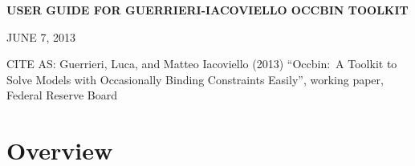 \documentclass[12pt]{article}
\begin{document}
\setcounter{secnumdepth}{-1}%

\renewcommand{\baselinestretch}{1.05}
\normalsize%

\begin{center}
\Large
\textbf{USER GUIDE FOR GUERRIERI-IACOVIELLO OCCBIN TOOLKIT}
\normalsize

\vspace{1cm}
JUNE 7, 2013
\end{center}

CITE AS: Guerrieri, Luca, and Matteo Iacoviello (2013) ``Occbin:\ A Toolkit
to Solve Models with Occasionally Binding Constraints Easily'', working
paper, Federal Reserve Board

\bigskip

\section{Overview}
\end{document}
